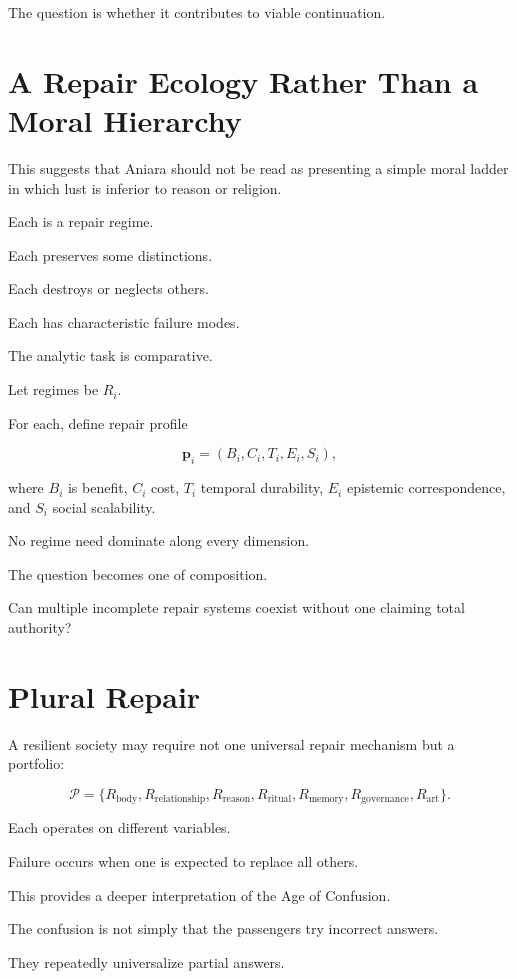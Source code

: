 \documentclass[11pt,oneside]{book}
\theoremstyle{definition}
\theoremstyle{remark}
\begin{document}
The question is whether it contributes to viable continuation.

\section{A Repair Ecology Rather Than a Moral Hierarchy}

This suggests that Aniara should not be read as presenting a simple moral ladder in which lust is inferior to reason or religion.

Each is a repair regime.

Each preserves some distinctions.

Each destroys or neglects others.

Each has characteristic failure modes.

The analytic task is comparative.

Let regimes be \(R_i\).

For each, define repair profile

\[
\mathbf p_i
=
(
B_i,
C_i,
T_i,
E_i,
S_i
),
\]

where \(B_i\) is benefit, \(C_i\) cost, \(T_i\) temporal durability, \(E_i\) epistemic correspondence, and \(S_i\) social scalability.

No regime need dominate along every dimension.

The question becomes one of composition.

Can multiple incomplete repair systems coexist without one claiming total authority?

\section{Plural Repair}

A resilient society may require not one universal repair mechanism but a portfolio:

\[
\mathcal P
=
\{
R_{\mathrm{body}},
R_{\mathrm{relationship}},
R_{\mathrm{reason}},
R_{\mathrm{ritual}},
R_{\mathrm{memory}},
R_{\mathrm{governance}},
R_{\mathrm{art}}
\}.
\]

Each operates on different variables.

Failure occurs when one is expected to replace all others.

This provides a deeper interpretation of the Age of Confusion.

The confusion is not simply that the passengers try incorrect answers.

They repeatedly universalize partial answers.
\end{document}
